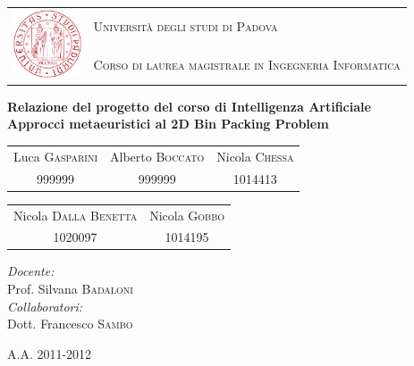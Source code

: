 \thispagestyle{empty}
\begin{center}
	\leavevmode
	\large
	\begin{tabular}{ r l }
		\multirow{2}{*}{\includegraphics[width=2cm]{img/unipd_logo.png}} & \textsc{Università degli studi di Padova}\par \\
			& \textsc{Corso di laurea magistrale in Ingegneria Informatica} \\
	\end{tabular}
	\vskip 3cm
	
	\vfill
	\textbf{{\large Relazione del progetto del corso di Intelligenza Artificiale}}\\[0.2cm]
	\textbf{{\LARGE Approcci metaeuristici al 2D Bin Packing Problem}}\par
	\vskip 3cm
	\normalfont
	
	\begin{tabular}{ c c c }
		\large Luca \textsc{Gasparini} & Alberto \textsc{Boccato} &
				Nicola \textsc{Chessa} \\
		\normalsize 999999 & 999999 & 1014413 \\
	\end{tabular}
	\vskip 0.5cm
	\begin{tabular}{ c c }
		\large Nicola \textsc{Dalla Benetta} & Nicola \textsc{Gobbo} \\
		\normalsize 1020097 & 1014195 \\
	\end{tabular}
	\normalfont
	\vskip 4cm
	
	\begin{flushright}
		\emph{Docente:}\\
		Prof. Silvana \textsc{Badaloni}\\
	 \vskip 2cm
		\emph{Collaboratori:}\\
		Dott. Francesco \textsc{Sambo}\\
	\end{flushright}

	
	\vfill
	{\large A.A. 2011-2012}
\end{center}
\cleardoublepage
